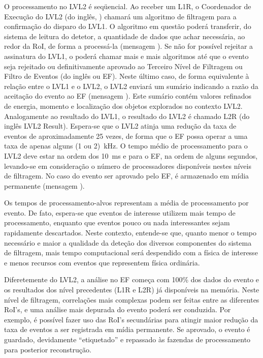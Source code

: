 O processamento no LVL2 é seqüencial. Ao receber um L1R, o Coordenador de
Execução do LVL2 (do inglês, ) chamará um algoritmo de filtragem
para a confirmação do disparo do LVL1. O algoritmo em questão poderá
transferir, do sistema de leitura do detetor, a quantidade de dados que achar
necessária, ao redor da RoI, de forma a processá-la (mensagem ). Se
não for possível rejeitar a assinatura do LVL1, o  poderá chamar
mais e mais algoritmos até que o evento seja rejeitado ou definitivamente
aprovado ao Terceiro Nível de Filtragem ou Filtro de Eventos (do inglês
 ou EF). Neste último caso, de forma equivalente à relação
entre o LVL1 e o LVL2, o LVL2 enviará um sumário indicando a razão da
aceitação do evento ao EF (mensagem ). Este sumário contém valores
refinados de energia, momento e localização dos objetos explorados no contexto
LVL2. Analogamente ao resultado do LVL1, o resultado do LVL2 é chamado L2R (do
inglês {LVL2 Result}). Espera-se que o LVL2 atinja uma redução da taxa de
eventos de aproximadamente 25 vezes, de forma que o EF possa operar a uma taxa
de apenas alguns (1 ou 2)~kHz. O tempo médio de processamento para o LVL2 deve
estar na ordem dos 10~ms e para o EF, na ordem de alguns segundos, levando-se
em consideração o número de processadores disponíveis nestes níveis de
filtragem. No caso do evento ser aprovado pelo EF, é armazenado em mídia
permanente (mensagem
).

Os tempos de processamento-alvos representam a média de processamento por
evento. De fato, espera-se que eventos de interesse utilizem mais tempo de
processamento, enquanto que eventos pouco ou nada interessantes sejam
rapidamente descartados. Neste contexto, entende-se que, quanto menor o tempo
necessário e maior a qualidade da deteção dos diversos componentes do sistema
de filtragem, mais tempo computacional será despendido com a física de
interesse e menos recursos com eventos que representem física ordinária.

Diferetemente do LVL2, a análise no EF começa com 100\% dos dados do evento e
os resultados dos nível precedentes (L1R e L2R) já disponíveis na
memória. Neste nível de filtragem, correlações mais complexas podem ser feitas
entre as diferentes RoI's, e uma análise mais depurada do evento poderá ser
conduzida. Por exemplo, é possível fazer uso das RoI's secundárias para
atingir maior redução da taxa de eventos a ser registrada em mídia
permanente. Se aprovado, o evento é guardado, devidamente ``etiquetado'' e
repassado às fazendas de processamento  para posterior
reconstrução.

